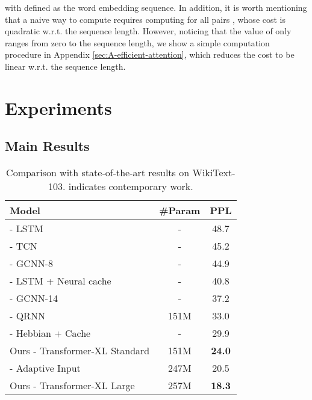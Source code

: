 \documentclass[11pt,a4paper]{article}
\begin{document}
\noindent with  defined as the word embedding sequence.
In addition, it is worth mentioning that a naive way to compute  requires computing  for all pairs , whose cost is quadratic w.r.t. the sequence length.
However, noticing that the value of  only ranges from zero to the sequence length,
we show a simple computation procedure in Appendix \ref{sec:A-efficient-attention}, which reduces the cost to be linear w.r.t. the sequence length.

 
\section{Experiments}
\label{sec:exp}

\subsection{Main Results}



\bgroup
\setlength{\tabcolsep}{3pt}
\begin{table}[t]
	\small
	\centering
	
	\begin{adjustwidth}{-4pt}{}
	\begin{tabular}{l|cc}
		\toprule
		\bf Model & \bf \#Param &  \bf PPL \\
		\midrule
		\citet{grave2016improving} - LSTM & - & 48.7 \\
		\citet{bai2018empirical} - TCN & - & 45.2 \\
		\citet{dauphin2016language} - GCNN-8 & - & 44.9 \\
		\citet{grave2016improving} - LSTM + Neural cache & - & 40.8 \\
		\citet{dauphin2016language} - GCNN-14 & - & 37.2 \\
		\citet{merity2018analysis} - QRNN & 151M & 33.0 \\
		\citet{rae2018fast} - Hebbian + Cache & - & 29.9 \\
		Ours - Transformer-XL Standard & 151M & \textbf{24.0} \\
		\midrule
		\citet{baevski2018adaptive} - Adaptive Input & 247M & 20.5 \\
		Ours - Transformer-XL Large & 257M & \textbf{18.3} \\
		\bottomrule
	\end{tabular}
	\caption{\small
		Comparison with state-of-the-art results on WikiText-103.  indicates contemporary work.
	}
	\label{table:103}
	\end{adjustwidth}
\end{table}
\egroup
\end{document}
